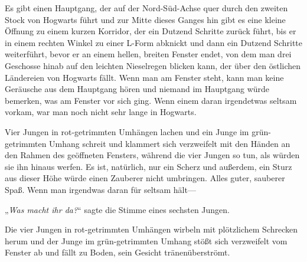 Es gibt einen Hauptgang, der auf der Nord-Süd-Achse quer durch den zweiten Stock von Hogwarts führt und zur Mitte dieses Ganges hin gibt es eine kleine Öffnung zu einem kurzen Korridor, der ein Dutzend Schritte zurück führt, bis er in einem rechten Winkel zu einer L-Form abknickt und dann ein Dutzend Schritte weiterführt, bevor er an einem hellen, breiten Fenster endet, von dem man drei Geschosse hinab auf den leichten Nieselregen blicken kann, der über den östlichen Ländereien von Hogwarts fällt. Wenn man am Fenster steht, kann man keine Geräusche aus dem Hauptgang hören und niemand im Hauptgang würde bemerken, was am Fenster vor sich ging. Wenn einem daran irgendetwas seltsam vorkam, war man noch nicht sehr lange in Hogwarts.

Vier Jungen in rot-getrimmten Umhängen lachen und ein Junge im grün-getrimmten Umhang schreit und klammert sich verzweifelt mit den Händen an den Rahmen des geöffneten Fensters, während die vier Jungen so tun, als würden sie ihn hinaus werfen. Es ist, natürlich, nur ein Scherz und außerdem, ein Sturz aus dieser Höhe würde einen Zauberer nicht umbringen. Alles guter, sauberer Spaß. Wenn man irgendwas daran für seltsam hält—

„\emph{Was macht ihr da?}“ sagte die Stimme eines sechsten Jungen.

Die vier Jungen in rot-getrimmten Umhängen wirbeln mit plötzlichem Schrecken herum und der Junge im grün-getrimmten Umhang stößt sich verzweifelt vom Fenster ab und fällt zu Boden, sein Gesicht tränenüberströmt.


